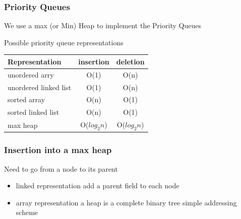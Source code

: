 \documentclass[newPxFont,sthlmFooter,nooffset]{beamer}
\begin{document}
\begin{frame}[t]
  \frametitle{Priority Queues}
We use a max (or Min) Heap to implement the Priority Queues

Possible priority queue representations

\begin{tabular}{l c c}
  Representation & insertion & deletion \\ \hline \hline
unordered arry & O(1) & O(n) \\
unordered linked list & O(1) & O(n) \\
sorted array & O(n) & O(1) \\
sorted linked list & O(n) & O(1) \\
max heap & O($log_2n$) &  O($log_2n$) \\
\end{tabular}
\end{frame}


\begin{frame}[t]
  \frametitle{Insertion into a max heap}
Need to go from a node to its parent
\begin{itemize}
\item linked representation add a parent field to each node
  \item array representation a heap is a complete binary tree simple
    addressing scheme
\end{itemize}
\end{frame}
\end{document}
